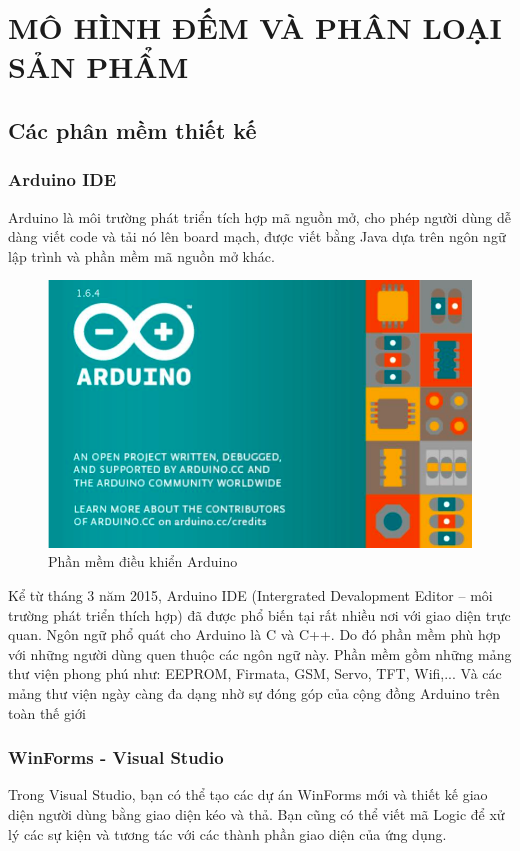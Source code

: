 \documentclass[12pt]{report}
\begin{document}
\chapter{MÔ HÌNH ĐẾM VÀ PHÂN LOẠI SẢN PHẨM}
\section{Các phân mềm thiết kế}

\subsection{Arduino IDE}
Arduino là môi trường phát triển tích hợp mã nguồn mở, cho phép người dùng dễ dàng viết code và tải nó lên board mạch, được viết bằng Java dựa trên ngôn ngữ lập trình và phần mềm mã nguồn mở khác.

    \begin{figure}[H]
        \centering
        \includegraphics[width=0.5\linewidth]{image/arduino_ide.png}
        \caption{Phần mềm điều khiển Arduino}
    \end{figure}
    
Kể từ tháng 3 năm 2015, Arduino IDE (Intergrated Devalopment Editor – môi
trường phát triển thích hợp) đã được phổ biến tại rất nhiều nơi với giao diện trực quan.
Ngôn ngữ phổ quát cho Arduino là C và C++. Do đó phần mềm phù hợp với những người dùng quen thuộc các ngôn ngữ này.
Phần mềm gồm những mảng thư viện phong phú như: EEPROM, Firmata, GSM, Servo, TFT, Wifi,... Và các mảng thư viện ngày càng đa dạng nhờ sự đóng góp của cộng đồng Arduino trên toàn thế giới

\subsection{WinForms - Visual Studio}
Trong Visual Studio, bạn có thể tạo các dự án WinForms mới và thiết kế giao diện người dùng bằng giao diện kéo và thả. Bạn cũng có thể viết mã Logic để xử lý các sự kiện và tương tác với các thành phần giao diện của ứng dụng.
\end{document}
